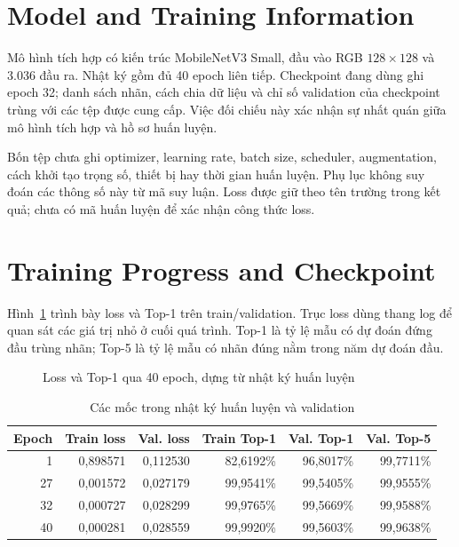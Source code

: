 \section{Model and Training Information}

Mô hình tích hợp có kiến trúc MobileNetV3 Small, đầu vào RGB $128\times128$ và 3.036 đầu ra. Nhật ký gồm đủ 40 epoch liên tiếp. Checkpoint đang dùng ghi epoch 32; danh sách nhãn, cách chia dữ liệu và chỉ số validation của checkpoint trùng với các tệp được cung cấp. Việc đối chiếu này xác nhận sự nhất quán giữa mô hình tích hợp và hồ sơ huấn luyện.

Bốn tệp chưa ghi optimizer, learning rate, batch size, scheduler, augmentation, cách khởi tạo trọng số, thiết bị hay thời gian huấn luyện. Phụ lục không suy đoán các thông số này từ mã suy luận. Loss được giữ theo tên trường trong kết quả; chưa có mã huấn luyện để xác nhận công thức loss.

\clearpage
\section{Training Progress and Checkpoint}

Hình~\ref{fig:handwriting-learning-curves} trình bày loss và Top-1 trên train/validation. Trục loss dùng thang log để quan sát các giá trị nhỏ ở cuối quá trình. Top-1 là tỷ lệ mẫu có dự đoán đứng đầu trùng nhãn; Top-5 là tỷ lệ mẫu có nhãn đúng nằm trong năm dự đoán đầu.

\begin{figure}[htbp]
\centering

\caption{Loss và Top-1 qua 40 epoch, dựng từ nhật ký huấn luyện}
\label{fig:handwriting-learning-curves}
\end{figure}

\begin{table}[htbp]
\centering
\caption{Các mốc trong nhật ký huấn luyện và validation}
\label{tab:handwriting-training-milestones}
\begingroup
\fontsize{11}{14}\selectfont
\begin{tabular}{@{}rrrrrr@{}}
\toprule
\textbf{Epoch} & \textbf{Train loss} & \textbf{Val. loss} & \textbf{Train Top-1} & \textbf{Val. Top-1} & \textbf{Val. Top-5} \\
\midrule
1 & 0,898571 & 0,112530 & 82,6192\% & 96,8017\% & 99,7711\% \\
27 & 0,001572 & 0,027179 & 99,9541\% & 99,5405\% & 99,9555\% \\
32 & 0,000727 & 0,028299 & 99,9765\% & 99,5669\% & 99,9588\% \\
40 & 0,000281 & 0,028559 & 99,9920\% & 99,5603\% & 99,9638\% \\
\bottomrule
\end{tabular}
\endgroup
\end{table}

